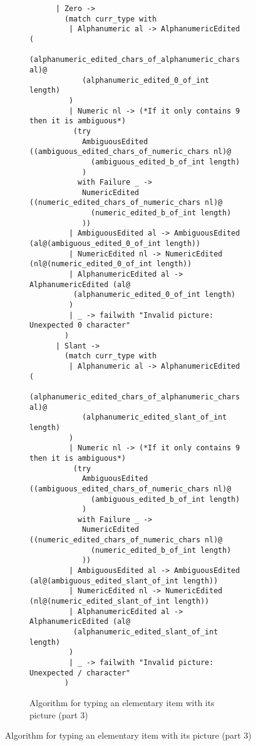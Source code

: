 \documentclass[a4paper,10pt]{article}
\begin{document}
\begin{figure}[!ht]
  \ContinuedFloat
  \begin{subfigure}{1.05\textwidth}
    \begin{verbatim}
      | Zero ->
        (match curr_type with
         | Alphanumeric al -> AlphanumericEdited (
          (alphanumeric_edited_chars_of_alphanumeric_chars al)@
            (alphanumeric_edited_0_of_int length)
         )
         | Numeric nl -> (*If it only contains 9 then it is ambiguous*)
          (try
            AmbiguousEdited ((ambiguous_edited_chars_of_numeric_chars nl)@
              (ambiguous_edited_b_of_int length)
            )
           with Failure _ ->
            NumericEdited ((numeric_edited_chars_of_numeric_chars nl)@
              (numeric_edited_b_of_int length)
            ))
         | AmbiguousEdited al -> AmbiguousEdited (al@(ambiguous_edited_0_of_int length))
         | NumericEdited nl -> NumericEdited (nl@(numeric_edited_0_of_int length))
         | AlphanumericEdited al -> AlphanumericEdited (al@
          (alphanumeric_edited_0_of_int length)
         )
         | _ -> failwith "Invalid picture: Unexpected 0 character"
        )
      | Slant ->
        (match curr_type with
         | Alphanumeric al -> AlphanumericEdited (
          (alphanumeric_edited_chars_of_alphanumeric_chars al)@
            (alphanumeric_edited_slant_of_int length)
         )
         | Numeric nl -> (*If it only contains 9 then it is ambiguous*)
          (try
            AmbiguousEdited ((ambiguous_edited_chars_of_numeric_chars nl)@
              (ambiguous_edited_b_of_int length)
            )
           with Failure _ ->
            NumericEdited ((numeric_edited_chars_of_numeric_chars nl)@
              (numeric_edited_b_of_int length)
            ))
         | AmbiguousEdited al -> AmbiguousEdited (al@(ambiguous_edited_slant_of_int length))
         | NumericEdited nl -> NumericEdited (nl@(numeric_edited_slant_of_int length))
         | AlphanumericEdited al -> AlphanumericEdited (al@
          (alphanumeric_edited_slant_of_int length)
         )
         | _ -> failwith "Invalid picture: Unexpected / character"
        )
    \end{verbatim}
    \caption{Algorithm for typing an elementary item with its picture (part 3)}
    \label{fig:algo_typ_elem_pic_3}
  \end{subfigure}
\end{figure}
\end{document}
